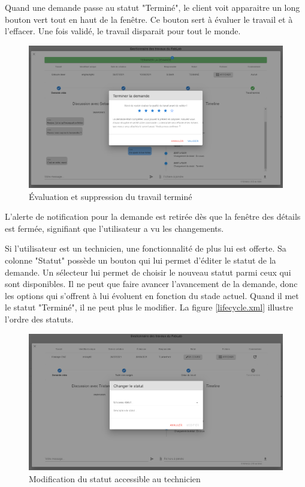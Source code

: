 \documentclass[
    iai, %
    eai, %
]{heig-tb}
\begin{document}
Quand une demande passe au statut "Terminé", le client voit apparaitre un long bouton vert tout en haut de la fenêtre. Ce bouton sert à évaluer le travail et à l'effacer. Une fois validé, le travail disparait pour tout le monde.

\begin{figure}[h]
  \includegraphics[width=14cm]{ui_jobinfo_client3.PNG}
  \caption{Évaluation et suppression du travail terminé}
\end{figure}

L'alerte de notification pour la demande est retirée dès que la fenêtre des détails est fermée, signifiant que l'utilisateur a vu les changements.

\newpage
Si l'utilisateur est un technicien, une fonctionnalité de plus lui est offerte. Sa colonne "Statut" possède un bouton qui lui permet d'éditer le statut de la demande. Un sélecteur lui permet de choisir le nouveau statut parmi ceux qui sont disponibles. Il ne peut que faire avancer l'avancement de la demande, donc les options qui s'offrent à lui évoluent en fonction du stade actuel. Quand il met le statut "Terminé", il ne peut plus le modifier. La figure \ref{lifecycle.xml} illustre l'ordre des statuts.

\begin{figure}[h]
  \includegraphics[width=14cm]{ui_jobinfo_tech2.PNG}
  \caption{Modification du statut accessible au technicien}
\end{figure}
\end{document}
